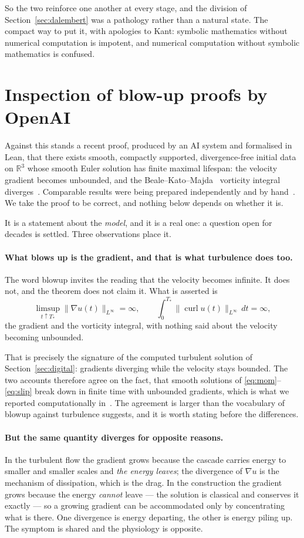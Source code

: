 \documentclass[11pt]{article}
\newcommand{\grad}{\nabla}
\begin{document}
So the two reinforce one another at every stage, and the division of Section~\ref{sec:dalembert} was
a pathology rather than a natural state. The compact way to put it, with apologies to Kant: symbolic
mathematics without numerical computation is impotent, and numerical computation without symbolic
mathematics is confused.

\section{Inspection of blow-up proofs by OpenAI}\label{sec:openai}

Against this stands a recent proof, produced by an AI system and formalised in Lean, that there
exists smooth, compactly supported, divergence-free initial data on $\mathbb{R}^3$ whose smooth Euler
solution has finite maximal lifespan: the velocity gradient becomes unbounded, and the
Beale--Kato--Majda~\cite{bkm} vorticity integral diverges~\cite{openaieuler}. Comparable results were being
prepared independently and by hand~\cite{buckmaster}. We take the proof to be correct, and nothing
below depends on whether it is.

It is a statement about the \emph{model}, and it is a real one: a question open for decades is
settled. Three observations place it.

\paragraph{What blows up is the gradient, and that is what turbulence does too.} The word blowup
invites the reading that the velocity becomes infinite. It does not, and the theorem does not claim
it. What is asserted is
\[
\limsup_{t\uparrow T_*}\|\grad u(t)\|_{L^\infty}=\infty ,
\qquad
\int_0^{T_*}\|\operatorname{curl}u(t)\|_{L^\infty}\,dt=\infty ,
\]
the gradient and the vorticity integral, with nothing said about the velocity becoming unbounded.

That is precisely the signature of the computed turbulent solution of
Section~\ref{sec:digital}: gradients diverging while the velocity stays bounded. The two accounts
therefore agree on the fact, that smooth solutions of \eqref{eq:mom}--\eqref{eq:slip} break down in
finite time with unbounded gradients, which is what we reported computationally
in~\cite{blowupHJ}. The agreement is larger than the vocabulary of blowup against turbulence
suggests, and it is worth stating before the differences.

\paragraph{But the same quantity diverges for opposite reasons.} In the turbulent flow the gradient
grows because the cascade carries energy to smaller and smaller scales and \emph{the energy leaves};
the divergence of $\grad u$ is the mechanism of dissipation, which is the drag. In the construction
the gradient grows because the energy \emph{cannot} leave --- the solution is classical and conserves
it exactly --- so a growing gradient can be accommodated only by concentrating what is there. One
divergence is energy departing, the other is energy piling up. The symptom is shared and the
physiology is opposite.
\end{document}
